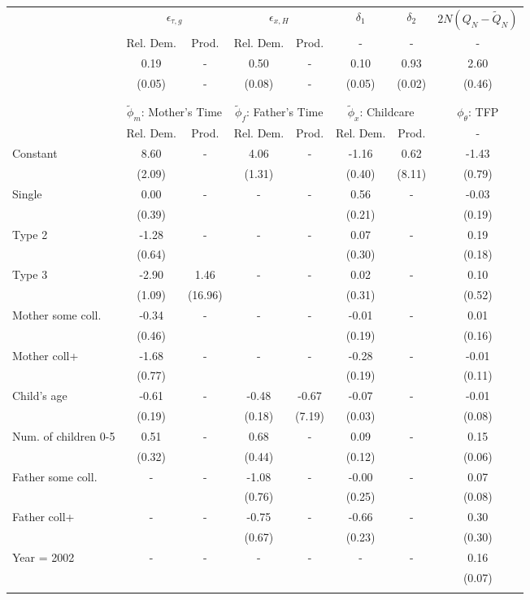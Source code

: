 \begin{tabular}{lccccccc}\toprule
 & \multicolumn{2}{c}{$\epsilon_{\tau,g}$} & \multicolumn{2}{c}{$\epsilon_{x,H}$} & {$\delta_{1}$} & {$\delta_{2}$} & $2N(Q_{N} - \tilde{Q}_{N})$ \\
 & Rel. Dem. & Prod. & Rel. Dem. & Prod. & - & - & - \\\cmidrule(r){2-3}\cmidrule(r){4-5}\cmidrule(r){6-6}\cmidrule(r){7-7}\cmidrule(r){8-8}
&0.19& - &0.50& - &0.10&0.93&2.60\\
&(0.05)& - &(0.08)& - &(0.05)&(0.02)&(0.46)\\
\\
&&&&&&&\\
 & \multicolumn{2}{c}{$\tilde{\phi}_{m}$: Mother's Time} & \multicolumn{2}{c}{$\tilde{\phi}_{f}$: Father's Time} & \multicolumn{2}{c}{$\tilde{\phi}_{x}$: Childcare} &{$\phi_{\theta}$: TFP} \\
 & Rel. Dem. & Prod. & Rel. Dem. & Prod. & Rel. Dem. & Prod. & -  \\\cmidrule(r){2-3}\cmidrule(r){4-5}\cmidrule(r){6-7}\cmidrule(r){8-8}
Constant&8.60& -&4.06& -&-1.16&0.62&-1.43\\
&(2.09)&&(1.31)&&(0.40)&(8.11)&(0.79)\\
Single&0.00& -& - & -&0.56& -&-0.03\\
&(0.39)& & &&(0.21)&&(0.19)\\
Type 2&-1.28& -& - & -&0.07& -&0.19\\
&(0.64)& & &&(0.30)&&(0.18)\\
Type 3&-2.90&1.46& - & -&0.02& -&0.10\\
&(1.09)&(16.96) & &&(0.31)&&(0.52)\\
Mother some coll.&-0.34& -& - & -&-0.01& -&0.01\\
&(0.46)& & &&(0.19)&&(0.16)\\
Mother coll+&-1.68& -& - & -&-0.28& -&-0.01\\
&(0.77)& & &&(0.19)&&(0.11)\\
Child's age&-0.61& -&-0.48&-0.67&-0.07& -&-0.01\\
&(0.19)&&(0.18)&(7.19)&(0.03)&&(0.08)\\
Num. of children 0-5&0.51& -&0.68& -&0.09& -&0.15\\
&(0.32)&&(0.44)&&(0.12)&&(0.06)\\
Father some coll.& - & -&-1.08& -&-0.00& -&0.07\\
 & &&(0.76)&&(0.25)&&(0.08)\\
Father coll+& - & -&-0.75& -&-0.66& -&0.30\\
 & &&(0.67)&&(0.23)&&(0.30)\\
Year = 2002& - & -& - & -& - & -&0.16\\
 & & & & & &&(0.07)\\
\\
\bottomrule\end{tabular}
